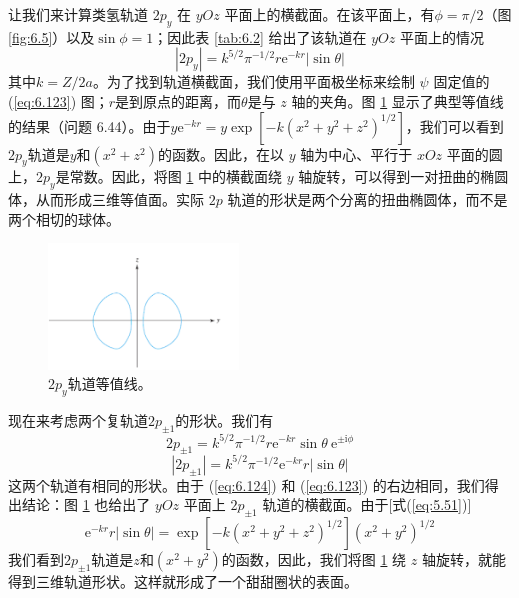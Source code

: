     让我们来计算类氢轨道 $2p_y$ 在 $yOz$ 平面上的横截面。在该平面上，有$\phi = \pi/2$（图\ref{fig:6.5}）以及$\sin\phi = 1$；因此表 \ref{tab:6.2} 给出了该轨道在 $yOz$ 平面上的情况
    \begin{equation}
        \left|2p_y\right| = k^{5/2}\pi^{-1/2}r\mathrm{e}^{-kr}\left|\sin\theta\right|
        \label{eq:6.123}
    \end{equation}
    其中$k = Z/2a$。为了找到轨道横截面，我们使用平面极坐标来绘制 $\psi$ 固定值的 (\ref{eq:6.123}) 图；$r$是到原点的距离，而$\theta$是与 $z$ 轴的夹角。图 \ref{fig:6.12} 显示了典型等值线的结果（问题 6.44）。由于$y\mathrm{e}^{-kr} = y\exp\left[-k\left(x^2+y^2+z^2\right)^{1/2}\right]$，我们可以看到$2p_y$轨道是$y$和$\left(x^2+z^2\right)$的函数。因此，在以 $y$ 轴为中心、平行于 $xOz$ 平面的圆上，$2p_y$是常数。因此，将图 \ref{fig:6.12} 中的横截面绕 $y$ 轴旋转，可以得到一对扭曲的椭圆体，从而形成三维等值面。实际 $2p$ 轨道的形状是两个分离的扭曲椭圆体，而不是两个相切的球体。
    \begin{figure}[h!]
        \centering
        \includegraphics[width=0.45\textwidth]{Figures/6.12.png}
        \caption{$2p_y$轨道等值线。}
        \label{fig:6.12}
    \end{figure}

    现在来考虑两个复轨道$2p_{\pm 1}$的形状。我们有
    \begin{equation*}
        2p_{\pm 1} = k^{5/2}\pi^{-1/2}r\mathrm{e}^{-kr}\sin\theta\:\mathrm{e}^{\pm \mathrm{i}\phi}
    \end{equation*}
    \begin{equation}
        \left|2p_{\pm 1}\right| = k^{5/2}\pi^{-1/2}\mathrm{e}^{-kr}r\left|\sin\theta\right|
        \label{eq:6.124}
    \end{equation}
    这两个轨道有相同的形状。由于 (\ref{eq:6.124}) 和 (\ref{eq:6.123}) 的右边相同，我们得出结论：图 \ref{fig:6.12} 也给出了 $yOz$ 平面上 $2p_{\pm 1}$ 轨道的横截面。由于[式(\ref{eq:5.51})]
    \begin{equation*}
        \mathrm{e}^{-kr}r\left|\sin\theta\right| = \exp\left[-k\left(x^2+y^2+z^2\right)^{1/2}\right]\left(x^2+y^2\right)^{1/2}
    \end{equation*}
    我们看到$2p_{\pm 1}$轨道是$z$和$\left(x^2+y^2\right)$的函数，因此，我们将图 \ref{fig:6.12} 绕 $z$ 轴旋转，就能得到三维轨道形状。这样就形成了一个甜甜圈状的表面。


